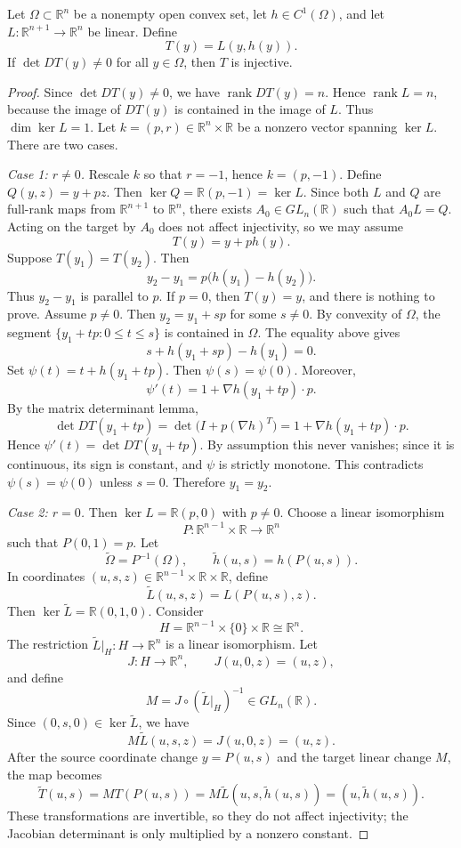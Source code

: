 \documentclass[10pt,a4paper]{amsart}
\DeclareMathOperator{\rank}{rank}
\begin{document}
\begin{lemma}\label{lem:convex-inj}
Let \(\Omega\subset\mathbb R^n\) be a nonempty open convex set, let \(h\in C^1(\Omega)\), and let \(L:\mathbb R^{n+1}\to\mathbb R^n\) be linear. Define
\[
T(y)=L(y,h(y)).
\]
If \(\det DT(y)\ne0\) for all \(y\in\Omega\), then \(T\) is injective.
\end{lemma}

\begin{proof}
Since \(\det DT(y)\ne0\), we have \(\rank DT(y)=n\). Hence \(\rank L=n\), because the image of \(DT(y)\) is contained in the image of \(L\). Thus \(\dim\ker L=1\). Let \(k=(p,r)\in\mathbb R^n\times\mathbb R\) be a nonzero vector spanning \(\ker L\). There are two cases.

\emph{Case 1: \(r\ne0\).} Rescale \(k\) so that \(r=-1\), hence \(k=(p,-1)\). Define \(Q(y,z)=y+pz\). Then \(\ker Q=\mathbb R(p,-1)=\ker L\). Since both \(L\) and \(Q\) are full-rank maps from \(\mathbb R^{n+1}\) to \(\mathbb R^n\), there exists \(A_0\in GL_n(\mathbb R)\) such that \(A_0L=Q\). Acting on the target by \(A_0\) does not affect injectivity, so we may assume
\[
T(y)=y+p h(y).
\]
Suppose \(T(y_1)=T(y_2)\). Then
\[
y_2-y_1=p\bigl(h(y_1)-h(y_2)\bigr).
\]
Thus \(y_2-y_1\) is parallel to \(p\). If \(p=0\), then \(T(y)=y\), and there is nothing to prove. Assume \(p\ne0\). Then \(y_2=y_1+sp\) for some \(s\ne0\). By convexity of \(\Omega\), the segment \(\{y_1+tp:0\le t\le s\}\) is contained in \(\Omega\). The equality above gives
\[
s+h(y_1+sp)-h(y_1)=0.
\]
Set \(\psi(t)=t+h(y_1+tp)\). Then \(\psi(s)=\psi(0)\). Moreover,
\[
\psi'(t)=1+\nabla h(y_1+tp)\cdot p.
\]
By the matrix determinant lemma,
\[
\det DT(y_1+tp)=\det\bigl(I+p(\nabla h)^T\bigr)=1+\nabla h(y_1+tp)\cdot p.
\]
Hence \(\psi'(t)=\det DT(y_1+tp)\). By assumption this never vanishes; since it is continuous, its sign is constant, and \(\psi\) is strictly monotone. This contradicts \(\psi(s)=\psi(0)\) unless \(s=0\). Therefore \(y_1=y_2\).

\emph{Case 2: \(r=0\).} Then \(\ker L=\mathbb R(p,0)\) with \(p\ne0\). Choose a linear isomorphism
\[
P:\mathbb R^{n-1}\times\mathbb R\to\mathbb R^n
\]
such that \(P(0,1)=p\). Let
\[
\widetilde\Omega=P^{-1}(\Omega),\qquad \widetilde h(u,s)=h(P(u,s)).
\]
In coordinates \((u,s,z)\in\mathbb R^{n-1}\times\mathbb R\times\mathbb R\), define
\[
\widetilde L(u,s,z)=L(P(u,s),z).
\]
Then \(\ker\widetilde L=\mathbb R(0,1,0)\). Consider
\[
H=\mathbb R^{n-1}\times\{0\}\times\mathbb R\cong\mathbb R^n.
\]
The restriction \(\widetilde L|_H:H\to\mathbb R^n\) is a linear isomorphism. Let
\[
J:H\to\mathbb R^n,
\qquad J(u,0,z)=(u,z),
\]
and define
\[
M=J\circ(\widetilde L|_H)^{-1}\in GL_n(\mathbb R).
\]
Since \((0,s,0)\in\ker\widetilde L\), we have
\[
M\widetilde L(u,s,z)=J(u,0,z)=(u,z).
\]
After the source coordinate change \(y=P(u,s)\) and the target linear change \(M\), the map becomes
\[
\widetilde T(u,s)=M T(P(u,s))=M\widetilde L(u,s,\widetilde h(u,s))=(u,\widetilde h(u,s)).
\]
These transformations are invertible, so they do not affect injectivity; the Jacobian determinant is only multiplied by a nonzero constant.


\end{proof}
\end{document}
